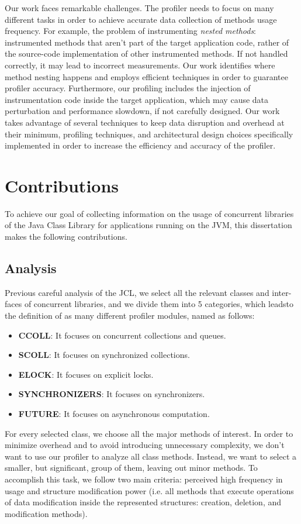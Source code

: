 \documentclass[]{usiinfthesis}
\begin{document}
Our work faces remarkable challenges. The profiler needs to focus on many different tasks in order to achieve accurate data collection of methods usage frequency. For example, the problem of instrumenting \textit{nested methods}: instrumented methods that aren’t part of the target application code, rather of the source-code implementation of other instrumented methods. If not handled correctly, it may lead to incorrect measurements. Our work identifies where method nesting happens and employs efficient techniques in order to guarantee profiler accuracy. Furthermore, our profiling includes the injection of instrumentation code inside the target application, which may cause data perturbation and performance slowdown, if not carefully designed. Our work takes advantage of several techniques to keep data disruption and overhead at their minimum, profiling techniques, and architectural design choices specifically implemented in order to increase the efficiency and accuracy of the profiler.


\section{Contributions}
To achieve our goal of collecting information on the usage of concurrent libraries of the Java Class Library for applications running on the JVM, this dissertation makes the following contributions.

\subsection{Analysis}
Previous careful analysis of the JCL, we select all the relevant classes and inter-faces of concurrent libraries, and we divide them into 5 categories, which leadsto the definition of as many different profiler modules, named as follows:
\begin{itemize}
    \item \textbf{CCOLL}: It focuses on concurrent collections and queues.
    \item \textbf{SCOLL}: It focuses on synchronized collections.
    \item \textbf{ELOCK}: It focuses on explicit locks.
    \item \textbf{SYNCHRONIZERS}: It focuses on synchronizers.
    \item \textbf{FUTURE}: It focuses on asynchronous computation.
\end{itemize}
For every selected class, we choose all the major methods of interest. In order to minimize overhead and to avoid introducing unnecessary complexity, we don’t want to use our profiler to analyze all class methods. Instead, we want to select a smaller, but significant, group of them, leaving out minor methods. To accomplish this task, we follow two main criteria: perceived high frequency in usage and structure modification power (i.e. all methods that execute operations of data modification inside the represented structures: creation, deletion, and modification methods).
\end{document}

